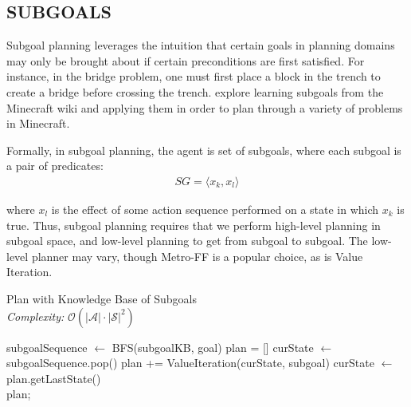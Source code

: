 \documentclass[]{article}
\begin{document}
\subsection{SUBGOALS}

Subgoal planning leverages the intuition that certain goals in
planning domains may only be brought about if certain preconditions
are first satisfied. For instance, in the bridge problem, one must
first place a block in the trench to create a bridge before crossing
the trench.  \citet{branavan12a} explore learning subgoals from the
Minecraft wiki and applying them in order to plan through a variety of
problems in Minecraft.  

Formally, in subgoal planning, the agent is set of subgoals, where each subgoal is a pair of predicates:
\begin{align}
SG = \langle x_k, x_l \rangle
\end{align}

where $x_l$ is the effect of some action sequence performed on 
a state in which $x_k$ is true. Thus, subgoal planning requires 
that we perform high-level planning in subgoal space, and low-level 
planning to get from subgoal to subgoal. The low-level planner may vary, though
Metro-FF is a popular choice, as is Value Iteration.

\begin{algorithm}
  \caption{Plan with Knowledge Base of Subgoals \\ {\it Complexity:} $\mathcal{O}(|\mathcal{A}|\cdot |\mathcal{S}|^2)$}
  \begin{algorithmic}[1]
    \State subgoalSequence $\gets$ BFS(subgoalKB, goal)
    \State plan = []
    \State curState $\gets$ subgoalSequence.pop()
    		\State plan += ValueIteration(curState, subgoal)
		\State curState $\gets$ plan.getLastState()
    \EndFor \\
    \Return plan;
  \end{algorithmic}
\end{algorithm}
\end{document}
